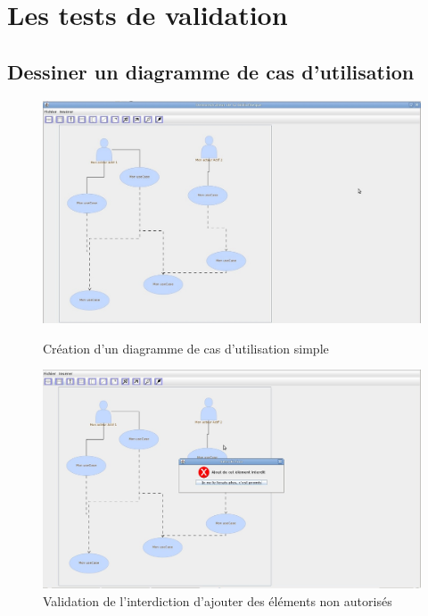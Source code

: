 \documentclass[12pt,a4paper,openany]{report}
\begin{document}
	\section{Les tests de validation}
		\subsection{Dessiner un diagramme de cas d'utilisation}
		\begin{figure}[H]
			\centering
			\includegraphics[width=16cm]{validation3.jpg}
			\caption{Création d'un diagramme de cas d'utilisation simple}
			\includegraphics[width=16cm]{validation4.jpg}
			\caption{Validation de l'interdiction d'ajouter des éléments non autorisés}
		\end{figure}
\end{document}
